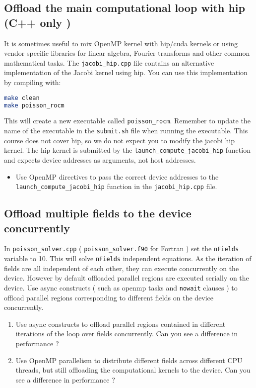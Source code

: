 \documentclass{article}
\begin{document}
\subsection{Offload the main computational loop with hip (C++ only )}
It is sometimes useful to mix OpenMP kernel with hip/cuda kernels or using vendor specific libraries for linear algebra, Fourier transforms and other common mathematical tasks. 
The \texttt{jacobi\_hip.cpp} file contains an alternative implementation of the Jacobi kernel using hip. You can use this implementation by compiling with: 

\begin{lstlisting}[language=Bash]
make clean
make poisson_rocm
\end{lstlisting}

This will create a new executable called \texttt{poisson\_rocm}. Remember to update the name of the executable in the \texttt{submit.sh} file when running the executable.
This course does not cover hip, so we do not expect you to modify the jacobi hip kernel. The hip kernel is submitted by the \texttt{launch\_compute\_jacobi\_hip} function and expects device addresses as arguments, not host addresses. 

\begin{itemize}
    \item Use OpenMP directives to pass the correct device addresses to the \texttt{launch\_compute\_jacobi\_hip} function in the \texttt{jacobi\_hip.cpp} file.
\end{itemize}

\subsection{Offload multiple fields to the device concurrently}
In \texttt{poisson\_solver.cpp} ( \texttt{poisson\_solver.f90} for Fortran ) set the \texttt{nFields} variable to 10. This will solve \texttt{nFields} independent equations. As the iteration of fields are all independent of each other, they can execute concurrently on the device. However by default offloaded parallel regions are executed serially on the device. Use async constructs ( such as openmp tasks and \texttt{nowait} clauses ) to offload parallel regions corresponding to different fields on the device concurrently.
\begin{enumerate}
    \item Use async constructs to offload parallel regions contained in different iterations of the loop over fields concurrently. Can you see a difference in performance ?
    \item Use OpenMP parallelism to distribute different fields across different CPU threads, but still offloading the computational kernels to the device.  Can you see a difference in performance ?
\end{enumerate}
\end{document}
